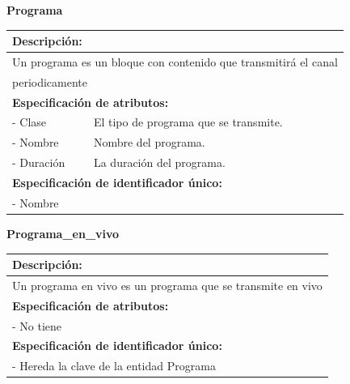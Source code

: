 \documentclass[a4paper,10pt]{article}
\begin{document}
    \begin{flushleft}
      \begin{large} \bf{Programa} \end{large}
    \end{flushleft}
      \begin{tabular}{| p{2cm} | p{9cm} |}
	\hline
	\multicolumn{2}{|l|}{\bf{Descripci\'on:}} \\
	\hline
	\multicolumn{2}{|l|}{Un programa es un bloque con contenido que transmitir\'a el canal} \\
	\multicolumn{2}{|l|}{periodicamente} \\
	\hline	
	\multicolumn{2}{|l|}{\bf{Especificaci\'on de atributos:}} \\
	\hline
	- Clase & El tipo de programa que se transmite. \\
	\hline \hline
	- Nombre & Nombre del programa. \\
	\hline \hline
	- Duraci\'on & La duraci\'on del programa.\\
	\hline
	\multicolumn{2}{|l|}{\bf{Especificaci\'on de identificador \'unico:}} \\
	\hline
	\multicolumn{2}{|l|}{- Nombre} \\
	\hline
      \end{tabular}
  
    \begin{flushleft}
      \begin{large} \bf{Programa\_en\_vivo} \end{large}
    \end{flushleft}
      \begin{tabular}{| p{2cm} | p{9cm} |}
	\hline
	\multicolumn{2}{|l|}{\bf{Descripci\'on:}} \\
	\hline
	\multicolumn{2}{|l|}{Un programa en vivo es un programa que se transmite en vivo} \\
	\hline	
	\multicolumn{2}{|l|}{\bf{Especificaci\'on de atributos:}} \\
	\hline
	- No tiene & \\
	\hline
	\multicolumn{2}{|l|}{\bf{Especificaci\'on de identificador \'unico:}} \\
	\hline
	\multicolumn{2}{|l|}{- Hereda la clave de la entidad Programa} \\
	\hline
      \end{tabular} 
  
\end{document}

